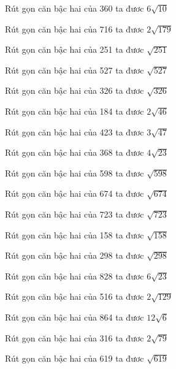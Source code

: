 \documentclass[12pt,a4paper]{article}
\begin{document}
\begin{ex}
Rút gọn căn bậc hai của 360 ta đươc $6\sqrt{10}$
\end{ex}
\begin{ex}
Rút gọn căn bậc hai của 716 ta đươc $2\sqrt{179}$
\end{ex}
\begin{ex}
Rút gọn căn bậc hai của 251 ta đươc $\sqrt{251}$
\end{ex}
\begin{ex}
Rút gọn căn bậc hai của 527 ta đươc $\sqrt{527}$
\end{ex}
\begin{ex}
Rút gọn căn bậc hai của 326 ta đươc $\sqrt{326}$
\end{ex}
\begin{ex}
Rút gọn căn bậc hai của 184 ta đươc $2\sqrt{46}$
\end{ex}
\begin{ex}
Rút gọn căn bậc hai của 423 ta đươc $3\sqrt{47}$
\end{ex}
\begin{ex}
Rút gọn căn bậc hai của 368 ta đươc $4\sqrt{23}$
\end{ex}
\begin{ex}
Rút gọn căn bậc hai của 598 ta đươc $\sqrt{598}$
\end{ex}
\begin{ex}
Rút gọn căn bậc hai của 674 ta đươc $\sqrt{674}$
\end{ex}
\begin{ex}
Rút gọn căn bậc hai của 723 ta đươc $\sqrt{723}$
\end{ex}
\begin{ex}
Rút gọn căn bậc hai của 158 ta đươc $\sqrt{158}$
\end{ex}
\begin{ex}
Rút gọn căn bậc hai của 298 ta đươc $\sqrt{298}$
\end{ex}
\begin{ex}
Rút gọn căn bậc hai của 828 ta đươc $6\sqrt{23}$
\end{ex}
\begin{ex}
Rút gọn căn bậc hai của 516 ta đươc $2\sqrt{129}$
\end{ex}
\begin{ex}
Rút gọn căn bậc hai của 864 ta đươc $12\sqrt{6}$
\end{ex}
\begin{ex}
Rút gọn căn bậc hai của 316 ta đươc $2\sqrt{79}$
\end{ex}
\begin{ex}
Rút gọn căn bậc hai của 619 ta đươc $\sqrt{619}$
\end{ex}
\end{document}
